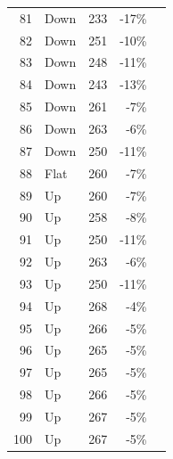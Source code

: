 \documentclass{scrartcl}
\begin{document}
\begin{longtable}{|r|l|r|r|r|}
    81    & Down  & 233   & \cellcolor[rgb]{ 1,  .78,  .808}\textcolor[rgb]{ .612,  0,  .024}{-17\%} &  \\
    82    & Down  & 251   & \cellcolor[rgb]{ 1,  .922,  .612}\textcolor[rgb]{ .612,  .341,  0}{-10\%} &  \\
    83    & Down  & 248   & \cellcolor[rgb]{ 1,  .78,  .808}\textcolor[rgb]{ .612,  0,  .024}{-11\%} &  \\
    84    & Down  & 243   & \cellcolor[rgb]{ 1,  .78,  .808}\textcolor[rgb]{ .612,  0,  .024}{-13\%} &  \\
    85    & Down  & 261   & \cellcolor[rgb]{ 1,  .922,  .612}\textcolor[rgb]{ .612,  .341,  0}{-7\%} &  \\
    86    & Down  & 263   & \cellcolor[rgb]{ 1,  .922,  .612}\textcolor[rgb]{ .612,  .341,  0}{-6\%} &  \\
    87    & Down  & 250   & \cellcolor[rgb]{ 1,  .78,  .808}\textcolor[rgb]{ .612,  0,  .024}{-11\%} &  \\
    88    & Flat  & 260   & \cellcolor[rgb]{ 1,  .922,  .612}\textcolor[rgb]{ .612,  .341,  0}{-7\%} &  \\
    89    & Up    & 260   & \cellcolor[rgb]{ 1,  .922,  .612}\textcolor[rgb]{ .612,  .341,  0}{-7\%} &  \\
    90    & Up    & 258   & \cellcolor[rgb]{ 1,  .922,  .612}\textcolor[rgb]{ .612,  .341,  0}{-8\%} &  \\
    91    & Up    & 250   & \cellcolor[rgb]{ 1,  .78,  .808}\textcolor[rgb]{ .612,  0,  .024}{-11\%} &  \\
    92    & Up    & 263   & \cellcolor[rgb]{ 1,  .922,  .612}\textcolor[rgb]{ .612,  .341,  0}{-6\%} &  \\
    93    & Up    & 250   & \cellcolor[rgb]{ 1,  .78,  .808}\textcolor[rgb]{ .612,  0,  .024}{-11\%} &  \\
    94    & Up    & 268   & -4\%  &  \\
    95    & Up    & 266   & -5\%  &  \\
    96    & Up    & 265   & -5\%  &  \\
    97    & Up    & 265   & -5\%  &  \\
    98    & Up    & 266   & -5\%  &  \\
    99    & Up    & 267   & -5\%  &  \\
    100   & Up    & 267   & -5\%  &  \\
\end{longtable}
\end{document}
